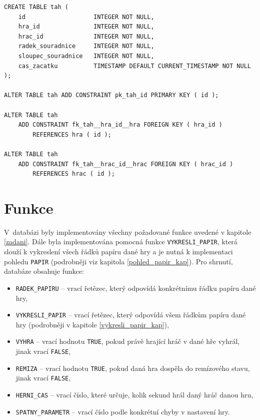 \documentclass[
11pt,
a4paper,
pdftex,
czech,
titlepage
]{report}
\begin{document}
\renewcommand{\lstlistingname}{Ukázka kódu}
\begin{lstlisting}
CREATE TABLE tah (
    id                   INTEGER NOT NULL,
    hra_id               INTEGER NOT NULL,
    hrac_id              INTEGER NOT NULL,
    radek_souradnice     INTEGER NOT NULL,
    sloupec_souradnice   INTEGER NOT NULL,
    cas_zacatku          TIMESTAMP DEFAULT CURRENT_TIMESTAMP NOT NULL
);

ALTER TABLE tah ADD CONSTRAINT pk_tah_id PRIMARY KEY ( id );

ALTER TABLE tah
    ADD CONSTRAINT fk_tah__hra_id__hra FOREIGN KEY ( hra_id )
        REFERENCES hra ( id );

ALTER TABLE tah
    ADD CONSTRAINT fk_tah__hrac_id__hrac FOREIGN KEY ( hrac_id )
        REFERENCES hrac ( id );
\end{lstlisting}


\section{Funkce}
V~databázi byly implementovány všechny požadované funkce uvedené v kapitole \ref{zadani}. Dále byla implementována pomocná funkce \texttt{VYKRESLI\_PAPIR}, která slouží k vykreslení všech řádků papíru dané hry a je nutná k implementaci pohledu \texttt{PAPIR} (podrobněji viz kapitola \ref{pohled_papir_kap}). Pro shrnutí, databáze obsahuje funkce:
\begin{itemize}
    \item \texttt{RADEK\_PAPIRU} -- vrací řetězec, který odpovídá konkrétnímu řádku papíru dané hry,
    \item \texttt{VYKRESLI\_PAPIR} -- vrací řetězec, který odpovídá všem řádkům papíru dané hry (podrobněji v kapitole \ref{vykresli_papir_kap}),
    \item \texttt{VYHRA} -- vrací hodnotu \texttt{TRUE}, pokud právě hrající hráč v dané hře vyhrál, jinak vrací \texttt{FALSE},
    \item \texttt{REMIZA} -- vrací hodnotu \texttt{TRUE}, pokud daná hra dospěla do remízového stavu, jinak vrací \texttt{FALSE},
    \item \texttt{HERNI\_CAS} -- vrací číslo, které určuje, kolik sekund hrál daný hráč danou hru,
    \item \texttt{SPATNY\_PARAMETR} -- vrací číslo podle konkrétní chyby v nastavení hry.
\end{itemize}
\end{document}
